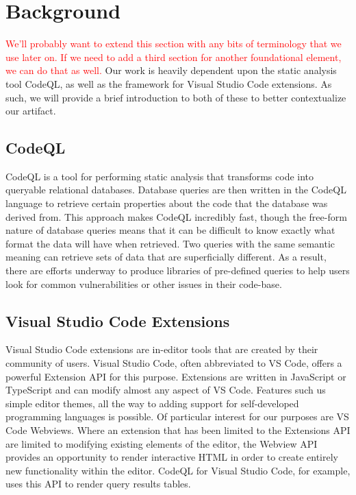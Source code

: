 \documentclass[sigplan,10pt,review]{acmart}
\begin{document}
\section{Background}
\textcolor{red}{We'll probably want to extend this section with any bits of terminology that we use later on. If we need to add a third section for another foundational element, we can do that as well.\newline}
Our work is heavily dependent upon the static analysis tool CodeQL, as well as the framework for Visual Studio Code extensions. As such, we will provide a brief introduction to both of these to better contextualize our artifact.
\subsection{CodeQL}
CodeQL is a tool for performing static analysis that transforms code into queryable relational databases. Database queries are then written in the CodeQL language to retrieve certain properties about the code that the database was derived from. This approach makes CodeQL incredibly fast, though the free-form nature of database queries means that it can be difficult to know exactly what format the data will have when retrieved.
\newline
\indent Two queries with the same semantic meaning can retrieve sets of data that are superficially different. As a result, there are efforts underway to produce libraries of pre-defined queries to help users look for common vulnerabilities or other issues in their code-base.
\subsection{Visual Studio Code Extensions}
Visual Studio Code extensions are in-editor tools that are created by their community of users. Visual Studio Code, often abbreviated to VS Code, offers a powerful Extension API for this purpose. Extensions are written in JavaScript or TypeScript and can modify almost any aspect of VS Code. Features such us simple editor themes, all the way to adding support for self-developed programming languages is possible.
\newline
\indent Of particular interest for our purposes are VS Code Webviews. Where an extension that has been limited to the Extensions API are limited to modifying existing elements of the editor, the Webview API provides an opportunity to render interactive HTML in order to create entirely new functionality within the editor. CodeQL for Visual Studio Code, for example, uses this API to render query results tables.
\end{document}
